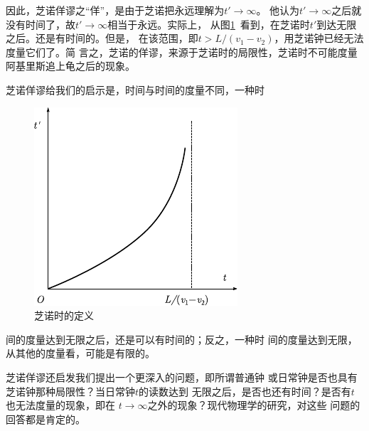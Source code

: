 因此，芝诺佯谬之“佯”，是由于芝诺把永远理解为$t'\rightarrow\infty$。
他认为$t'\rightarrow\infty$之后就没有时间了，故$t'\rightarrow\infty$相当于永远。实际上，
从图\ref{fig:01.03}~看到，在芝诺时$ t' $到达无限之后。还是有时间的。但是，
在该范围，即$ t>L/(v_1-v_2) $，用芝诺钟已经无法度量它们了。简
言之，芝诺的佯谬，来源于芝诺时的局限性，芝诺时不可能度量
阿基里斯追上龟之后的现象。

芝诺佯谬给我们的启示是，时间与时间的度量不同，一种时\clearpage
\begin{figure}
    \includegraphics{figure/fig01.03}
    \caption{芝诺时的定义}
    \label{fig:01.03}
\end{figure}
\noindent 间的度量达到无限之后，还是可以有时间的；反之，一种时
间的度量达到无限，从其他的度量看，可能是有限的。

芝诺佯谬还启发我们提出一个更深入的问题，即所谓普通钟
或日常钟是否也具有芝诺钟那种局限性？当日常钟$t$的读数达到
无限之后，是否也还有时间？是否有$t$也无法度量的现象，即在
$t\rightarrow\infty$之外的现象？现代物理学的研究，对这些
问题的回答都是肯定的。
